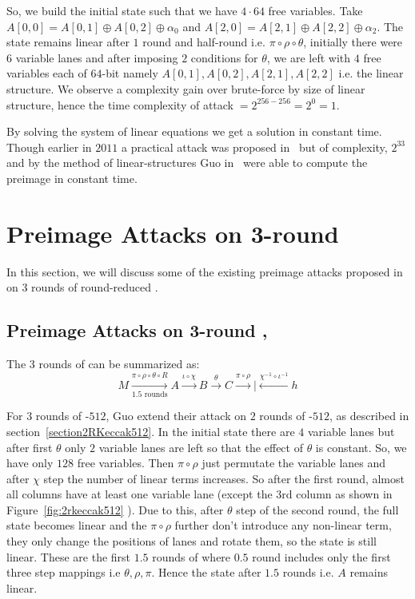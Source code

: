     So, we build the initial state such that we have $4 \cdot 64$ free variables. Take $A[0, 0] = A[0, 1] \oplus A[0, 2] \oplus \alpha_0$ and $A[2, 0] = A[2, 1] \oplus A[2, 2] \oplus \alpha_2$. The state remains linear after $1$ round and half-round i.e. $\pi \circ \rho \circ \theta$, initially there were $6$ variable lanes and after imposing $2$ conditions for $\theta$, we are left with $4$ free variables each of $64$-bit namely $A[0,1], A[0,2], A[2,1], A[2,2]$ i.e. the linear structure. We observe a complexity gain over brute-force by size of linear structure, hence the time complexity of attack$\;= 2^{256 - 256} = 2^{0} = 1$.
    
    By solving the system of linear equations we get a solution in constant time. Though earlier in $2011$ a practical attack was proposed in~\cite{naya2011practical} but of complexity, $2^{33}$ and by the method of linear-structures Guo \etal in~\cite{guo2016linear} were able to compute the preimage in constant time.

\section{Preimage Attacks on 3-round \KECCAK{}}

In this section, we will discuss some of the existing preimage attacks proposed in~\cite{guo2016linear} on $3$ rounds of round-reduced \KECCAK{}.

\subsection{Preimage Attacks on 3-round , }
\label{3rkeccak512attack}
The 3 rounds of \KECCAK{} can be summarized as:
   \begin{equation}\label{3r_eq}
    M \xrightarrow[\text{1.5 rounds}]{ \pi \circ \rho \circ \theta \circ R} A \xrightarrow[]{ \iota \circ \chi } B \xrightarrow[]{ \theta } C \xrightarrow[]{ \pi \circ \rho } | \xleftarrow[]{ \chi^{-1} \circ \iota^{-1} } h  
    \end{equation}

  For $3$ rounds of \KECCAK-$512$, Guo \etal extend their attack on $2$ rounds of \KECCAK-$512$, as described in section~\ref{section2RKeccak512}. In the initial state there are $4$ variable lanes but after first $\theta$ only $2$ variable lanes are left so that the effect of $\theta$ is constant. So, we have only $128$ free variables. Then $\pi \circ \rho$ just permutate the variable lanes and after $\chi$ step the number of linear terms increases. So after the first round, almost all columns have at least one variable lane (except the 3rd column as shown in Figure~\ref{fig:2rkeccak512} ). Due to this, after $\theta$ step of the second round, the full state becomes linear and the $\pi \circ \rho$ further don't introduce any non-linear term, they only change the positions of lanes and rotate them, so the state is still linear.  These are the first $1.5$ rounds of \KECCAK{} where $0.5$ round includes only the first three step mappings i.e $\theta, \rho, \pi$. Hence the state after $1.5$ rounds i.e. $A$ remains linear.
  
